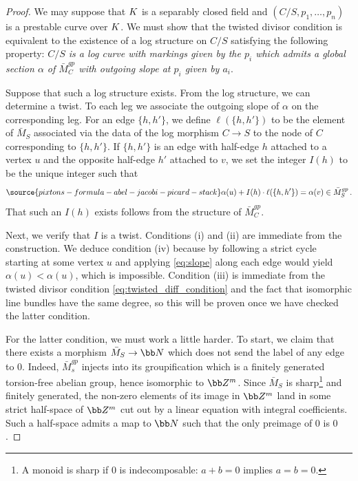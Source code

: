 \begin{proof}
We may suppose that ${K}$ is a separably closed field and $(C/S, p_1, \dots, p_n)$ is a prestable curve over ${K}$. We must show
that the twisted divisor condition is equivalent to the existence of a log structure on $C/S$ satisfying the following property: {\em $C/S$  is a log curve with markings given by the $p_i$  which admits
a global section $\alpha$ of $\bar M_C^{gp}$ with outgoing slope at $p_i$ given by $a_i$}.

Suppose that such a log structure exists. From the log structure,
we can determine a twist. To each leg we associate the outgoing
slope of $\alpha$ on the corresponding leg. For an edge $\{ h, h'\}$,
we define $\ell(\{ h, h'\})$ to be the element of $\bar M_S$ associated via the data of the log morphism $C \to S$ to the node of $C$ corresponding to $\{h,h'\}$. If $\{ h, h'\}$ is an edge with half-edge $h$ attached to a vertex $u$ and the opposite half-edge $h'$ attached to $v$, we set the integer $I(h)$ to be the unique integer such that
\begin{equation}\label{eq:slope}
\source{pixtons-formula-abel-jacobi-picard-stack}
\alpha(u) + I(h)\cdot \ell(\{h,h'\})  = \alpha(v) \in \bar M_S^{gp}\, .
\end{equation}
That such an $I(h)$ exists follows from the structure of $\bar M_C^{gp}$.

Next, we verify that $I$ is a twist. Conditions (i) and (ii) are immediate from the construction.  We deduce condition (iv) because by following
a strict cycle starting at some vertex $u$ and applying \eqref{eq:slope} along each edge would yield
$\alpha(u) < \alpha(u)$,
which is impossible. Condition (iii) is immediate from the twisted divisor condition \eqref{eq:twisted_diff_condition} and the fact that isomorphic line bundles have the same degree, so this will be proven once we have checked the latter condition.

For the latter condition,
we must work a little harder. To start,
we claim that there exists a morphism $\bar M_S \to \bb N$ which does not send the label of any edge to $0$. Indeed, $\bar M_s^{gp}$ injects into its groupification which is a finitely generated torsion-free abelian group, hence isomorphic to $\bb Z^m$. Since $\bar M_S$ is sharp\footnote{A monoid is sharp if $0$ is indecomposable: $a+b=0$ implies $a=b=0$.} and finitely generated, the non-zero elements of its image in $\bb Z^m$ land in some strict half-space of $\bb Z^m$ cut out by a linear equation with integral coefficients.  Such a half-space admits a map to $\bb N$ such that the only preimage of $0$ is $0$.


\end{proof}
